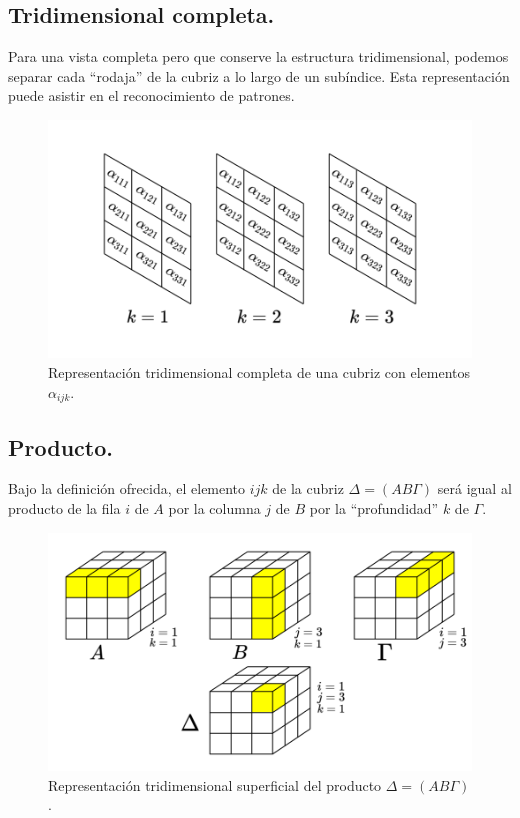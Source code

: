 \documentclass[a4paper, titlepage]{article}
\begin{document}
\subsection{Tridimensional completa.}

Para una vista completa pero que conserve la estructura tridimensional, podemos separar cada ``rodaja'' de la cubriz a lo largo de un subíndice. Esta representación puede asistir en el reconocimiento de patrones.

\begin{figure}[H]
	\includegraphics[width=\linewidth]{tridimensional_comp.png}
	\caption{Representación tridimensional completa de una cubriz con elementos $\alpha_{ijk}$.}
\end{figure}

\subsection{Producto.}

Bajo la definición ofrecida, el elemento $ijk$ de la cubriz $\Delta = (AB\Gamma)$ será igual al producto de la fila $i$ de $A$ por la columna $j$ de $B$ por la ``profundidad'' $k$ de $\Gamma$.

\begin{figure}[H]
	\includegraphics[width=\linewidth]{product.png}
	\caption{Representación tridimensional superficial del producto $\Delta = (AB\Gamma)$.}
\end{figure}
\end{document}
